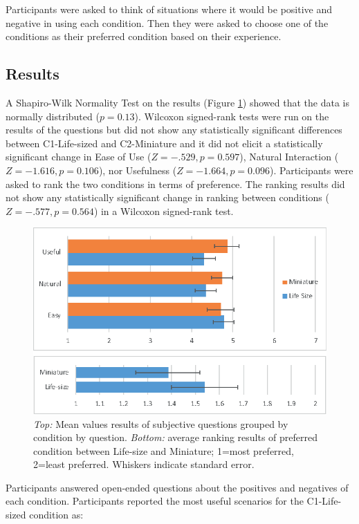 Participants were asked to think of situations where it would be positive and negative in using each condition. Then they were asked to choose one of the conditions as their preferred condition based on their experience.

\subsection{Results}

A Shapiro-Wilk Normality Test on the results (Figure \ref{fig:continuum:results}) showed that the data is normally distributed ($p=0.13$). Wilcoxon signed-rank tests were run on the results of the questions but did not show any statistically significant differences between C1-Life-sized and C2-Miniature and it did not elicit a statistically significant change in Ease of Use ($Z=-.529, p=0.597$), Natural Interaction ($Z=-1.616, p=0.106$), nor Usefulness ($Z=-1.664, p=0.096$). Participants were asked to rank the two conditions in terms of preference. The ranking results did not show any statistically significant change in ranking between conditions ($Z=-.577, p=0.564$) in a Wilcoxon signed-rank test.

\begin{figure}[h]
    \centering
    \includegraphics[width=0.8\linewidth]{images/ismar17/images-09.eps}
    \caption{\textit{Top:} Mean values results of subjective questions grouped by condition by question. \textit{Bottom:} average ranking results of preferred condition between Life-size and Miniature; 1=most preferred, 2=least preferred. Whiskers indicate standard error.}
    \label{fig:continuum:results}
\end{figure}

Participants answered open-ended questions about the positives and negatives of each condition. Participants reported the most useful scenarios for the C1-Life-sized condition as:

